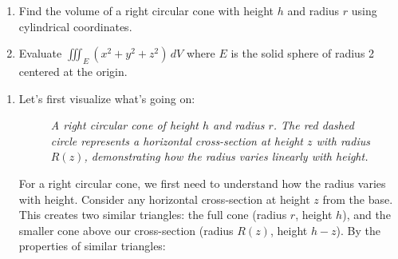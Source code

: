 \exampleline
\begin{example}
\begin{enumerate}
    \item Find the volume of a right circular cone with height $h$ and radius $r$ using cylindrical coordinates.
    \item Evaluate $\displaystyle\iiint_E (x^2 + y^2 + z^2)\,dV$ where $E$ is the solid sphere of radius 2 centered at the origin.
\end{enumerate}

\begin{solution}
\begin{enumerate}
    \item Let's first visualize what's going on:
\begin{figure}[H]
\centering
{}
\caption{\textit{A right circular cone of height $h$ and radius $r$. The red dashed circle represents a horizontal cross-section at height $z$ with radius $R(z)$, demonstrating how the radius varies linearly with height.}}
\label{fig:right_circular_cone}
\end{figure}
\noindent For a right circular cone, we first need to understand how the radius varies with height. Consider any horizontal cross-section at height $z$ from the base. This creates two similar triangles: the full cone (radius $r$, height $h$), and the smaller cone above our cross-section (radius $R(z)$, height $h-z$). By the properties of similar triangles:
    

\end{enumerate}
\end{solution}
\end{example}
